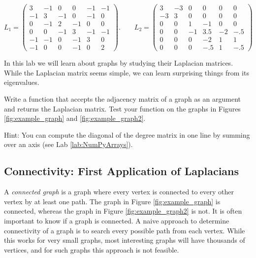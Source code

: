 \[
L_1 = \begin{pmatrix}
3 & -1 & 0 & 0 & -1 & -1\\
-1 & 3 & -1 & 0 & -1 & 0\\
0 & -1 & 2 & -1 & 0 & 0\\
0 & 0 & -1 & 3 & -1 & -1\\
-1 & -1 & 0 & -1 & 3& 0\\
-1 & 0 & 0 & -1 & 0 & 2
\end{pmatrix}. \qquad L_2 = 
 \begin{pmatrix}
3 & -3 & 0 & 0 & 0 & 0\\
-3 & 3 & 0 & 0 & 0 & 0\\
0 & 0 & 1 & -1 & 0 & 0\\
0 & 0 & -1 & 3.5 & -2 & -.5\\
0 & 0 & 0 & -2 & 1 & 1\\
0 & 0 & 0 &- .5 & 1 & -.5
\end{pmatrix}
\]

In this lab we will learn about graphs by studying their Laplacian matrices.
While the Laplacian matrix seems simple, we can learn surprising things from its eigenvalues.


\begin{problem}
Write a function that accepts the adjacency matrix of a graph as an argument and returns the Laplacian matrix. 
Test your function on the graphs in Figures \ref{fig:example_graph} and \ref{fig:example_graph2}.

Hint: You can compute the diagonal of the degree matrix in one line by summing over an axis (see Lab \ref{lab:NumPyArrays}).
\label{prob:laplacian}
\end{problem}



\subsection*{Connectivity: First Application of Laplacians}

A \emph{connected graph} is a graph where every vertex is connected to every other vertex by at least one path.
The graph in Figure \ref{fig:example_graph} is connected, whereas the graph in Figure \ref{fig:example_graph2} is not.
It is often important to know if a graph is connected.
A naive approach to determine connectivity of a graph is to search every possible path from each vertex.
While this works for very small graphs, most interesting graphs will have thousands of vertices, and for such graphs this approach is not feasible.

